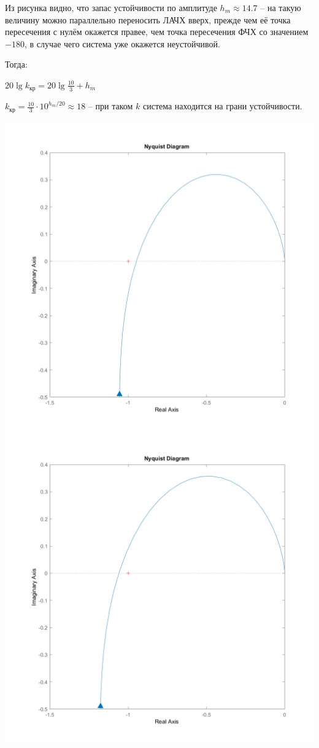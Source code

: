 \documentclass[a4paper,12pt]{article}
\newcommand{\ds}{\displaystyle}
\renewcommand{\^}[2]{#1^{\, #2} \kern -1pt}
\newcommand{\1}{\kern 1pt}
\newcommand{\0}{\kern -1pt}
\begin{document}
	Из рисунка видно, что запас устойчивости по амплитуде $h_m \approx 14.7$ -- на такую величину можно параллельно переносить ЛАЧХ вверх, прежде чем её точка пересечения с нулём окажется правее, чем точка пересечения ФЧХ со значением $-180$, в случае чего система уже окажется неустойчивой.
	
	Тогда:
	
	$\ds 20 \lg k_{\text{кр}} = 20 \lg \frac{10}{3} + h_m$
	
	$\ds k_{\text{кр}} = \frac{10}{3} \cdot 10^{h_m/20} \approx 18$ -- при таком $k$ система находится на грани устойчивости.
	
	\hspace{-2.0cm}\includegraphics[scale=0.30,page=1]{АФЧХ_3(1.k17).png}
	\includegraphics[scale=0.30,page=1]{АФЧХ_3(1.k19).png}
	
\end{document}
